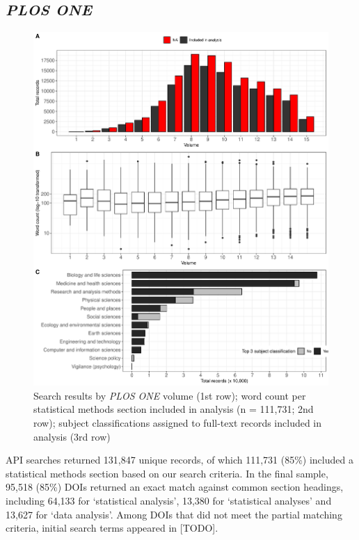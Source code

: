 \documentclass[
]{article}
\begin{document}
\hypertarget{plos-one}{%
\subsection{\texorpdfstring{\emph{PLOS ONE}}{PLOS ONE}}\label{plos-one}}

\begin{figure}
\centering
\includegraphics{draft_manuscript_files/figure-latex/unnamed-chunk-3-1.pdf}
\caption{\label{fig:unnamed-chunk-3}\label{fig:plos-n}Search results by \emph{PLOS ONE} volume (1st row); word count per statistical methods section included in analysis (n = 111,731; 2nd row); subject classifications assigned to full-text records included in analysis (3rd row)}
\end{figure}

API searches returned 131,847 unique records, of which 111,731 (85\%) included a statistical methods section based on our search criteria. In the final sample, 95,518 (85\%) DOIs returned an exact match against common section headings, including 64,133 for `statistical analysis', 13,380 for `statistical analyses' and 13,627 for `data analysis'. Among DOIs that did not meet the partial matching criteria, initial search terms appeared in {[}TODO{]}.
\end{document}
